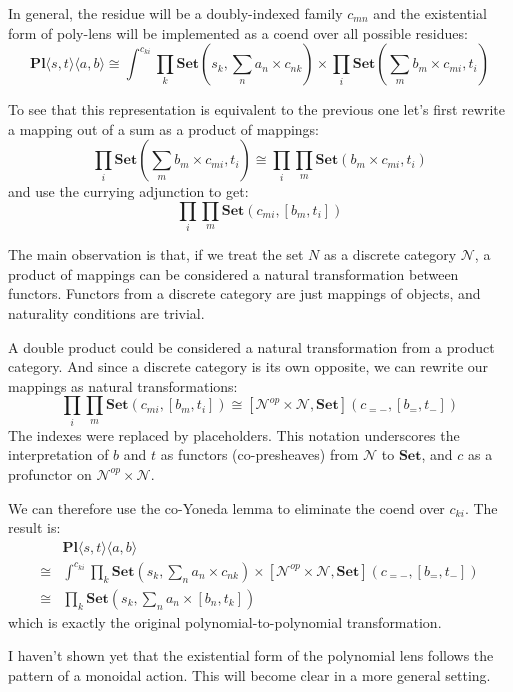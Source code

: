 \documentclass[11pt]{amsart}
\begin{document}
In general, the residue will be a doubly-indexed family $c_{m n}$ and the existential form of poly-lens will be implemented as a coend over all possible residues:
\[ \mathbf{Pl}\langle s, t\rangle \langle a, b\rangle \cong \int^{c_{k i}} 
 \prod_k \mathbf{Set} \left(s_k,  \sum_n a_n \times c_{n k} \right) \times 
 \prod_i  \mathbf{Set} \left(\sum_m b_m \times c_{m i}, t_i \right) \]

To see that this representation is equivalent to the previous one let's first rewrite a mapping out of a sum as a product of mappings:
\[ \prod_i  \mathbf{Set} \left(\sum_m b_m \times c_{m i}, t_i \right) \cong 
\prod_i \prod_m \mathbf{Set}\left(b_m \times c_{m i}, t_i \right)\]
and use the currying adjunction to get:
\[ \prod_i \prod_m \mathbf{Set}\left(c_{m i}, [b_m, t_i ]\right)\]

The main observation is that, if we treat the set $N$ as a discrete category $\mathcal{N}$, a product of mappings can be considered a natural transformation between functors. Functors from a discrete category are just mappings of objects, and naturality conditions are trivial. 


A double product could be considered a natural transformation from a product category. And since a discrete category is its own opposite, we can rewrite our mappings as natural transformations:
\[ \prod_i \prod_m \mathbf{Set} \left(c_{m i}, [b_m, t_i] \right) \cong 
[\mathcal{N}^{op} \times \mathcal{N}, \mathbf{Set}]\left(c_{= -}, [b_=, t_- ]\right)\]
The indexes were replaced by placeholders. This notation underscores the interpretation of $b$ and $t$ as functors (co-presheaves) from $\mathcal{N}$ to $\mathbf{Set}$, and $c$ as a profunctor on $\mathcal{N}^{op} \times \mathcal{N}$.

 
 We can therefore use the co-Yoneda lemma to eliminate the coend over $c_{ki}$. The result is:
 \begin{align*}
 &\mathbf{Pl}\langle s, t\rangle \langle a, b\rangle
 \\
\cong & \int^{c_{k i}} 
 \prod_k \mathbf{Set} \left(s_k,  \sum_n a_n \times c_{n k} \right) \times 
 [\mathcal{N}^{op} \times \mathcal{N}, \mathbf{Set}]\left(c_{= -}, [b_=, t_- ]\right) 
\\
\cong & \prod_k \mathbf{Set}\left(s_k, \sum_n a_n \times [b_n, t_k] \right)
 \end{align*}
which is exactly the original polynomial-to-polynomial transformation.

I haven't shown yet that the existential form of the polynomial lens follows the pattern of a monoidal action. This will become clear in a more general setting.
\end{document}
